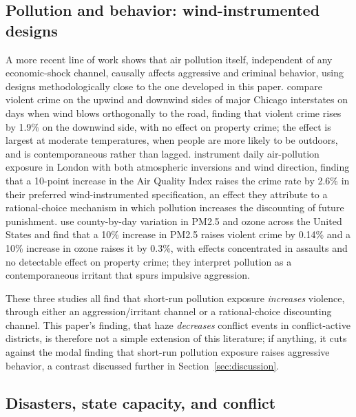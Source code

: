 \documentclass[12pt]{article}
\begin{document}
\subsection{Pollution and behavior: wind-instrumented designs}

A more recent line of work shows that air pollution itself, independent of any economic-shock channel, causally affects aggressive and criminal behavior, using designs methodologically close to the one developed in this paper. \citet{herrnstadt2021} compare violent crime on the upwind and downwind sides of major Chicago interstates on days when wind blows orthogonally to the road, finding that violent crime rises by 1.9\% on the downwind side, with no effect on property crime; the effect is largest at moderate temperatures, when people are more likely to be outdoors, and is contemporaneous rather than lagged. \citet{bondyrothsager2020} instrument daily air-pollution exposure in London with both atmospheric inversions and wind direction, finding that a 10-point increase in the Air Quality Index raises the crime rate by 2.6\% in their preferred wind-instrumented specification, an effect they attribute to a rational-choice mechanism in which pollution increases the discounting of future punishment. \citet{burkhardt2019} use county-by-day variation in PM2.5 and ozone across the United States and find that a 10\% increase in PM2.5 raises violent crime by 0.14\% and a 10\% increase in ozone raises it by 0.3\%, with effects concentrated in assaults and no detectable effect on property crime; they interpret pollution as a contemporaneous irritant that spurs impulsive aggression.

These three studies all find that short-run pollution exposure \emph{increases} violence, through either an aggression/irritant channel or a rational-choice discounting channel. This paper's finding, that haze \emph{decreases} conflict events in conflict-active districts, is therefore not a simple extension of this literature; if anything, it cuts against the modal finding that short-run pollution exposure raises aggressive behavior, a contrast discussed further in Section~\ref{sec:discussion}.

\subsection{Disasters, state capacity, and conflict}
\end{document}
